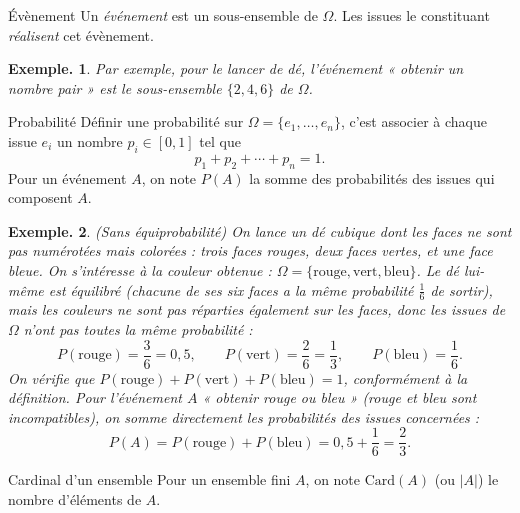 \documentclass[12pt]{article}
\theoremstyle{break}
\newtheorem*{example}{Exemple.}
\begin{document}
\begin{definition}{Évènement}{}
  Un \emph{événement} est un sous-ensemble de $\Omega$. Les issues le constituant \emph{réalisent} cet évènement.
\end{definition}
\begin{example}
  Par exemple, pour le lancer de dé, l'événement « obtenir un nombre pair » est le sous-ensemble $\{2,4,6\}$ de $\Omega$.
\end{example}
 
\begin{definition}{Probabilité}{}
Définir une probabilité sur $\Omega=\{e_1,\dots,e_n\}$, c'est associer à chaque issue $e_i$ un nombre $p_i\in[0,1]$ tel que
\[
p_1+p_2+\cdots+p_n = 1.
\]
  Pour un événement $A$, on note $P(A)$ la somme des probabilités des issues qui composent $A$.
\end{definition}


\begin{example}(Sans équiprobabilité)
On lance un dé cubique dont les faces ne sont pas numérotées mais colorées : trois faces rouges, deux faces vertes, et une face bleue. On s'intéresse à la couleur obtenue : $\Omega = \{\text{rouge}, \text{vert}, \text{bleu}\}$. Le dé lui-même est équilibré (chacune de ses six faces a la même probabilité $\frac16$ de sortir), mais les couleurs ne sont pas réparties également sur les faces, donc les issues de $\Omega$ n'ont pas toutes la même probabilité :
\[
P(\text{rouge}) = \frac{3}{6} = 0{,}5, \qquad P(\text{vert}) = \frac{2}{6} = \frac13, \qquad P(\text{bleu}) = \frac{1}{6}.
\]
On vérifie que $P(\text{rouge})+P(\text{vert})+P(\text{bleu})=1$, conformément à la définition. Pour l'événement $A$ « obtenir rouge ou bleu » (rouge et bleu sont incompatibles), on somme directement les probabilités des issues concernées :
\[
P(A) = P(\text{rouge})+P(\text{bleu}) = 0{,}5+\frac16 = \frac23.
\]
\end{example}

 
\begin{definition}{Cardinal d'un ensemble}{}
  Pour un ensemble fini $A$, on note $\mathrm{Card}(A)$ (ou $|A|$) le nombre d'éléments de $A$.
\end{definition}
 
\end{document}

